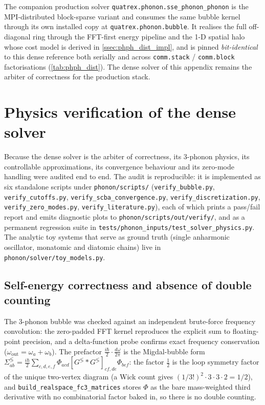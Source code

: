 The companion production solver
\texttt{quatrex.phonon.sse\_phonon\_phonon} is the MPI-distributed
block-sparse variant and consumes the same bubble kernel through its
own installed copy at \texttt{quatrex.phonon.bubble}.  It realises the
full off-diagonal ring through the FFT-first energy pipeline and the
1-D spatial halo whose cost model is derived in
\cref{ssec:phph_dist_impl}, and is pinned \emph{bit-identical} to this
dense reference both serially and across \texttt{comm.stack} /
\texttt{comm.block} factorisations (\cref{tab:phph_dist}).  The dense
solver of this appendix remains the arbiter of correctness for the
production stack.

\section{Physics verification of the dense solver}
\label{sec:phonon_solver_verification}

Because the dense solver is the arbiter of correctness, its
3-phonon physics, its controllable approximations, its convergence
behaviour and its zero-mode handling were audited end to end. The
audit is reproducible: it is implemented as six standalone scripts
under \texttt{phonon/scripts/} (\texttt{verify\_bubble.py},
\texttt{verify\_cutoffs.py}, \texttt{verify\_scba\_convergence.py},
\texttt{verify\_discretization.py}, \texttt{verify\_zero\_modes.py},
\texttt{verify\_literature.py}), each of which prints a pass/fail
report and emits diagnostic plots to \texttt{phonon/scripts/out/verify/},
and as a permanent regression suite in
\texttt{tests/phonon\_inputs/test\_solver\_physics.py}. The analytic
toy systems that serve as ground truth (single anharmonic oscillator,
monatomic and diatomic chains) live in
\texttt{phonon/solver/toy\_models.py}.

\subsection{Self-energy correctness and absence of double counting}

The 3-phonon bubble was checked against an independent brute-force
frequency convolution: the zero-padded FFT kernel reproduces the
explicit sum to floating-point precision, and a delta-function probe
confirms exact frequency conservation
($\omega_\mathrm{out}=\omega_a+\omega_b$). The prefactor
$\tfrac{i\hbar}{2}\cdot\tfrac{d\omega}{2\pi}$ is the Migdal-bubble
form $\Sigma^{\lessgtr}_{ab}=\tfrac{i\hbar}{2}\sum_{c,d,e,f}
\Phi_{acd}[G^{\lessgtr}\!*\!G^{\lessgtr}]_{cf,de}\Phi_{bef}$:
the factor $\tfrac12$ is the loop
symmetry factor of the unique two-vertex diagram (a Wick count gives
$(1/3!)^2\cdot 3\cdot 3\cdot 2 = 1/2$), and
\texttt{build\_realspace\_fc3\_matrices} stores $\Phi$ as the bare
mass-weighted third derivative with no combinatorial factor baked in,
so there is no double counting.

